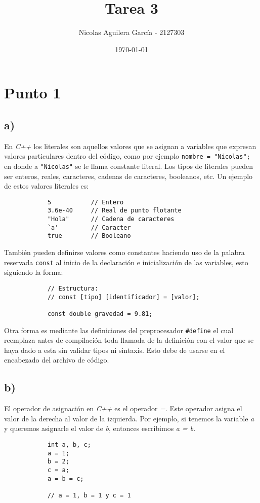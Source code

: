 \documentclass[10pt]{article}
\title{Tarea 3}
\author{Nicolas Aguilera García - 2127303}
\date{\today}
\begin{document}
    \maketitle

    \section*{Punto 1}
        \subsection*{a)}
        En \textit{C++} los literales son aquellos valores que se asignan a variables que expresan valores particulares dentro del código, como por ejemplo \texttt{nombre = "Nicolas";} en donde a \texttt{"Nicolas"} se le llama constante literal.
        Los tipos de literales pueden ser enteros, reales, caracteres, cadenas de caracteres, booleanos, etc. Un ejemplo de estos valores literales es:
        \begin{verbatim}
            5           // Entero
            3.6e-40     // Real de punto flotante
            "Hola"      // Cadena de caracteres
            `a'         // Caracter
            true        // Booleano
        \end{verbatim}
        También pueden definirse valores como constantes haciendo uso de la palabra reservada \texttt{const} al inicio de la declaración e inicialización de las variables, esto siguiendo la forma:
        \begin{verbatim}
            // Estructura:
            // const [tipo] [identificador] = [valor];
            
            const double gravedad = 9.81;
        \end{verbatim}
        Otra forma es mediante las definiciones del preprocesador \texttt{\#define} el cual reemplaza antes de compilación toda llamada de la definición con el valor que se haya dado a esta sin validar tipos ni sintaxis. Esto debe de usarse en el encabezado del archivo de código.


        \subsection*{b)}
        El operador de asignación en \textit{C++} es el operador \textit{=}. Este operador asigna el valor de la derecha al valor de la izquierda. Por ejemplo, si tenemos la variable \textit{a} y queremos asignarle el valor de \textit{b}, entonces escribimos \textit{a = b}.
        \begin{verbatim}
            int a, b, c;
            a = 1;
            b = 2;
            c = a;
            a = b = c;
            
            // a = 1, b = 1 y c = 1
        \end{verbatim}
\end{document}
